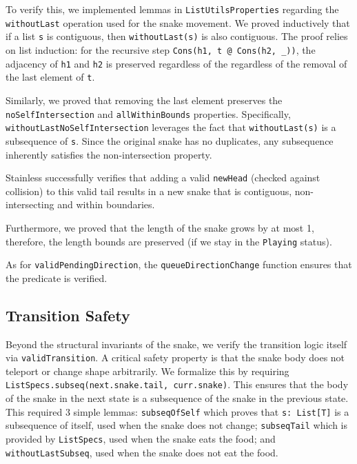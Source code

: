 \documentclass[letterpaper, 11pt]{article}
\begin{document}
To verify this, we implemented lemmas in \texttt{ListUtilsProperties} regarding the
\texttt{withoutLast} operation used for the snake movement.
We proved inductively that if a list \texttt{s} is contiguous, then
\texttt{withoutLast(s)} is also contiguous. The proof relies on list induction:
for the recursive step \texttt{Cons(h1, t @ Cons(h2, _))}, the adjacency of \texttt{h1}
and \texttt{h2} is preserved regardless of the regardless of the removal of the last element of
\texttt{t}.

Similarly, we proved that removing the last element preserves the
\texttt{noSelfIntersection} and \texttt{allWithinBounds}
properties. Specifically, \texttt{withoutLastNoSelfIntersection} leverages the fact that
\texttt{withoutLast(s)} is a subsequence of \texttt{s}. Since the original snake has no
duplicates, any subsequence inherently satisfies the non-intersection property.

Stainless successfully verifies that adding a valid \texttt{newHead} (checked against
collision) to this valid tail results in a new snake that is contiguous, non-intersecting and within
boundaries.

Furthermore, we proved that the length of the snake grows by at most 1, therefore, the length bounds
are preserved (if we stay in the \texttt{Playing} status).

As for \texttt{validPendingDirection}, the \texttt{queueDirectionChange}
function ensures that the predicate is verified.


\subsection{Transition Safety}
Beyond the structural invariants of the snake, we verify the transition logic itself via
\texttt{validTransition}.
A critical safety property is that the snake body does not teleport or change shape arbitrarily.
We formalize this by requiring \texttt{ListSpecs.subseq(next.snake.tail, curr.snake)}.
This ensures that the body of the snake in the next state is a subsequence of the snake in the
previous state.
This required 3 simple lemmas: \texttt{subseqOfSelf} which proves that
\texttt{s: List[T]} is a subsequence of itself, used when the snake does not change;
\texttt{subseqTail} which is provided by \texttt{ListSpecs}, used when the
snake eats the food; and \texttt{withoutLastSubseq}, used when the snake does not eat the
food.
\end{document}
